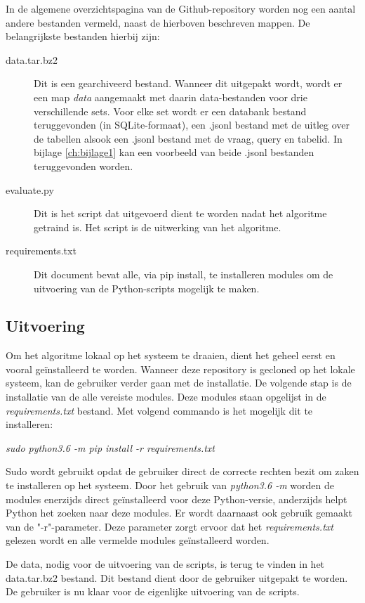 In de algemene overzichtspagina van de Github-repository worden nog een aantal andere bestanden vermeld, naast de hierboven beschreven mappen. De belangrijkste bestanden hierbij zijn:
\begin{description}
	\item[data.tar.bz2] Dit is een gearchiveerd bestand. Wanneer dit uitgepakt wordt, wordt er een map \textit{data} aangemaakt met daarin data-bestanden voor drie verschillende sets. Voor elke set wordt er een databank bestand teruggevonden (in SQLite-formaat), een .jsonl bestand met de uitleg over de tabellen alsook een .jsonl bestand met de vraag, query en tabelid. In bijlage \ref{ch:bijlage1} kan een voorbeeld van beide .jsonl bestanden teruggevonden worden.
	\item[evaluate.py] Dit is het script dat uitgevoerd dient te worden nadat het algoritme getraind is. Het script is de uitwerking van het algoritme.
	\item[requirements.txt] Dit document bevat alle, via pip install, te installeren modules om de uitvoering van de Python-scripts mogelijk te maken.
\end{description}

\subsection{Uitvoering}

Om het algoritme lokaal op het systeem te draaien, dient het geheel eerst en vooral geïnstalleerd te worden. Wanneer deze repository is gecloned op het lokale systeem, kan de gebruiker verder gaan met de installatie. De volgende stap is de installatie van de alle vereiste modules. Deze modules staan opgelijst in de \textit{requirements.txt} bestand. Met volgend commando is het mogelijk dit te installeren:
\begin{center}
	\textit{sudo python3.6 -m pip install -r requirements.txt}
\end{center}
Sudo wordt gebruikt opdat de gebruiker direct de correcte rechten bezit om zaken te installeren op het systeem. Door het gebruik van \textit{python3.6 -m} worden de modules enerzijds direct geïnstalleerd voor deze Python-versie, anderzijds helpt Python het zoeken naar deze modules. Er wordt daarnaast ook gebruik gemaakt van de "-r"-parameter. Deze parameter zorgt ervoor dat het \textit{requirements.txt} gelezen wordt en alle vermelde modules geïnstalleerd worden.

De data, nodig voor de uitvoering van de scripts, is terug te vinden in het data.tar.bz2 bestand. Dit bestand dient door de gebruiker uitgepakt te worden. De gebruiker is nu klaar voor de eigenlijke uitvoering van de scripts.

